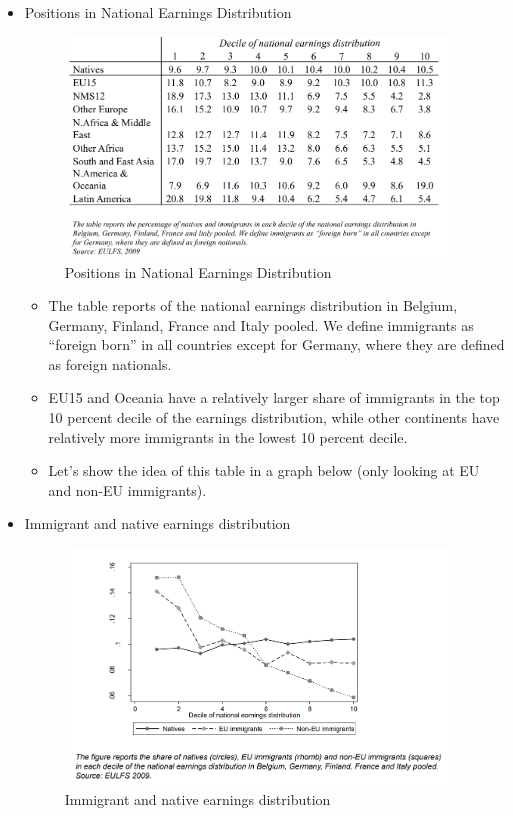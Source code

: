\begin{itemize}
\item Positions in National Earnings Distribution
\begin{figure}[H]
                \centering
                \includegraphics[width=4in]{images/ch11/8.png}
                \caption{Positions in National Earnings Distribution}
            \end{figure}
\begin{itemize}
    \item  The table reports  of the national earnings distribution in Belgium, Germany, Finland, France and Italy pooled. We define immigrants as “foreign born” in all countries except for Germany, where they are defined as foreign nationals.
    \item EU15 and Oceania have a relatively larger share of immigrants in the top 10 percent decile of the earnings distribution, while other continents have relatively more immigrants in the lowest 10 percent decile. 
    \item Let's show the idea of this table in a graph below (only looking at EU and non-EU immigrants).
    \end{itemize}

\item Immigrant and native earnings distribution
\begin{figure}[H]
                \centering
                \includegraphics[width=4in]{images/ch11/9.png}
                \caption{Immigrant and native earnings distribution}
            \end{figure}
            

\end{itemize}
